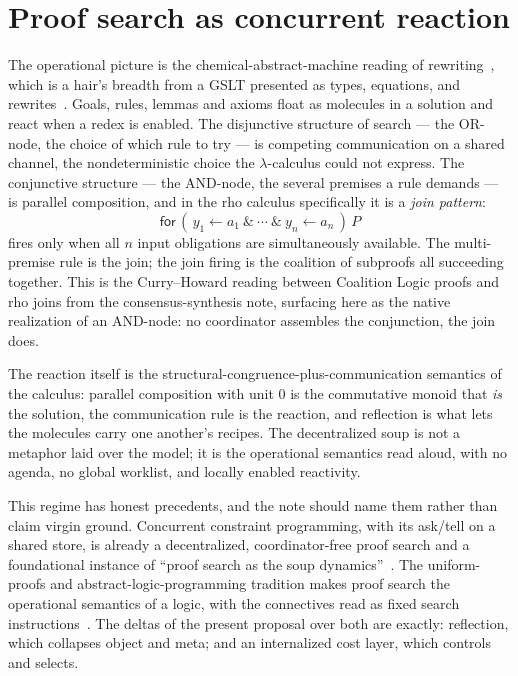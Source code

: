 \documentclass[11pt]{article}
\theoremstyle{plain}
\theoremstyle{definition}
\theoremstyle{remark}
\begin{document}
\section{Proof search as concurrent reaction}

The operational picture is the chemical-abstract-machine reading of
rewriting~\cite{berryboudol}, which is a hair's breadth from a GSLT presented as
types, equations, and rewrites~\cite{meseguer}. Goals, rules, lemmas and axioms
float as molecules in a solution and react when a redex is enabled. The
disjunctive structure of search --- the OR-node, the choice of which rule to try
--- is competing communication on a shared channel, the nondeterministic choice
the $\lambda$-calculus could not express. The conjunctive structure --- the
AND-node, the several premises a rule demands --- is parallel composition, and
in the rho calculus specifically it is a \emph{join pattern}:
\[
\textsf{for}\,(\,y_1 \leftarrow a_1\ \&\ \cdots\ \&\ y_n \leftarrow a_n\,)\,P
\]
fires only when all $n$ input obligations are simultaneously available. The
multi-premise rule is the join; the join firing is the coalition of subproofs
all succeeding together. This is the Curry--Howard reading between Coalition
Logic proofs and rho joins from the consensus-synthesis note, surfacing here as
the native realization of an AND-node: no coordinator assembles the conjunction,
the join does.

The reaction itself is the structural-congruence-plus-communication semantics of
the calculus: parallel composition with unit $0$ is the commutative monoid that
\emph{is} the solution, the communication rule is the reaction, and reflection
is what lets the molecules carry one another's recipes. The decentralized soup
is not a metaphor laid over the model; it is the operational semantics read
aloud, with no agenda, no global worklist, and locally enabled reactivity.

This regime has honest precedents, and the note should name them rather than
claim virgin ground. Concurrent constraint programming, with its ask/tell on a
shared store, is already a decentralized, coordinator-free proof search and a
foundational instance of ``proof search as the soup
dynamics''~\cite{saraswat}. The uniform-proofs and abstract-logic-programming
tradition makes proof search the operational semantics of a logic, with the
connectives read as fixed search instructions~\cite{miller}. The deltas of the
present proposal over both are exactly: reflection, which collapses object and
meta; and an internalized cost layer, which controls and selects.
\end{document}
